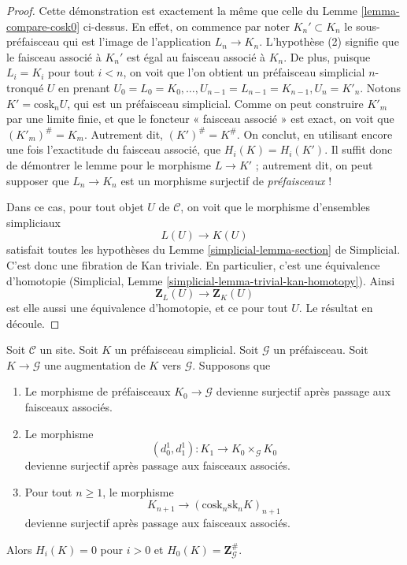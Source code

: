 \begin{proof}
Cette démonstration est exactement la même que celle du
Lemme \ref{lemma-compare-cosk0} ci-dessus. En effet,
on commence par noter $K_n' \subset K_n$ le sous-préfaisceau
qui est l'image de l'application $L_n \to K_n$. L'hypothèse
(2) signifie que le faisceau associé à $K_n'$ est égal au
faisceau associé à $K_n$. De plus, puisque $L_i = K_i$
pour tout $i < n$, on voit que l'on obtient un préfaisceau simplicial
$n$-tronqué $U$ en prenant
$U_0 = L_0 = K_0, \ldots, U_{n - 1} = L_{n - 1} = K_{n - 1}, U_n = K'_n$.
Notons $K' = \text{cosk}_n U$, qui est un préfaisceau simplicial.
Comme on peut construire $K'_m$ par une limite finie, et
que le foncteur « faisceau associé » est exact, on voit que
$(K'_m)^\# = K_m$. Autrement dit, $(K')^\# = K^\#$.
On conclut, en utilisant encore une fois l'exactitude du faisceau associé,
que $H_i(K) = H_i(K')$. Il suffit donc de démontrer le lemme
pour le morphisme $L \to K'$ ; autrement dit, on peut
supposer que $L_n \to K_n$ est un morphisme surjectif
de {\it préfaisceaux} !

\medskip\noindent
Dans ce cas, pour tout objet $U$ de $\mathcal{C}$,
on voit que le morphisme d'ensembles simpliciaux
$$
L(U) \longrightarrow K(U)
$$
satisfait toutes les hypothèses du
Lemme \ref{simplicial-lemma-section} de Simplicial.
C'est donc une fibration de Kan triviale. En particulier, c'est
une équivalence d'homotopie
(Simplicial, Lemme \ref{simplicial-lemma-trivial-kan-homotopy}).
Ainsi
$$
\mathbf{Z}_L(U) \longrightarrow \mathbf{Z}_K(U)
$$
est elle aussi une équivalence d'homotopie, et ce pour tout $U$.
Le résultat en découle.
\end{proof}

\begin{lemma}
\label{lemma-acyclic-hypercover-sheaves}
Soit $\mathcal{C}$ un site.
Soit $K$ un préfaisceau simplicial.
Soit $\mathcal{G}$ un préfaisceau.
Soit $K \to \mathcal{G}$ une augmentation de $K$
vers $\mathcal{G}$. Supposons que
\begin{enumerate}
\item Le morphisme de préfaisceaux $K_0 \to \mathcal{G}$ devienne
surjectif après passage aux faisceaux associés.
\item Le morphisme
$$
(d^1_0, d^1_1) :
K_1
\longrightarrow
K_0 \times_\mathcal{G} K_0
$$
devienne surjectif après passage aux faisceaux associés.
\item Pour tout $n \geq 1$, le morphisme
$$
K_{n + 1} \longrightarrow (\text{cosk}_n \text{sk}_n K)_{n + 1}
$$
devienne surjectif après passage aux faisceaux associés.
\end{enumerate}
Alors $H_i(K) = 0$ pour $i > 0$ et
$H_0(K) = \mathbf{Z}_\mathcal{G}^\#$.
\end{lemma}

